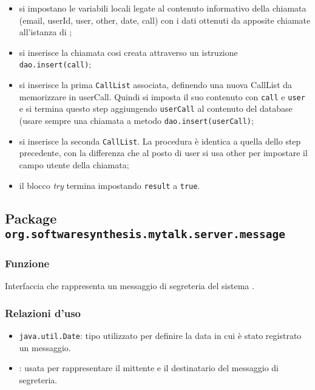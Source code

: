 \begin{description}
\begin{itemize}
	\item si impostano le variabili locali legate al contenuto informativo della chiamata (email, userId, user, other, date, call) con i dati ottenuti da apposite chiamate all'istanza di ;
	\item si inserisce la chiamata cosi creata attraverso un istruzione \texttt{dao.insert(call)};
	\item si inserisce la prima \texttt{CallList} associata, definendo una nuova CallList da memorizzare in userCall. Quindi si imposta il suo contenuto con \texttt{call} e \texttt{user} e si termina questo step aggiungendo \texttt{userCall} al contenuto del database (usare sempre una chiamata a metodo \texttt{dao.insert(userCall)};
	\item si inserisce la seconda \texttt{CallList}. La procedura è identica a quella dello step precedente, con la differenza che  al posto di user si usa other per impostare il campo utente della chiamata;
	\item il blocco \textit{try} termina impostando \texttt{result} a \texttt{true}.
\end{itemize}

\end{description}

\subsection{Package \texttt{org.softwaresynthesis.mytalk.server.message}}\label{sec:message}


\subsubsection*{Funzione}
Interfaccia che rappresenta un messaggio di segreteria del sistema \caName.

\subsubsection*{Relazioni d'uso}
\begin{itemize}
	\item \texttt{java.util.Date}: tipo utilizzato per definire la data in cui è stato registrato un messaggio.
	\item {}: usata per rappresentare il mittente e il destinatario del messaggio di segreteria.
\end{itemize}

